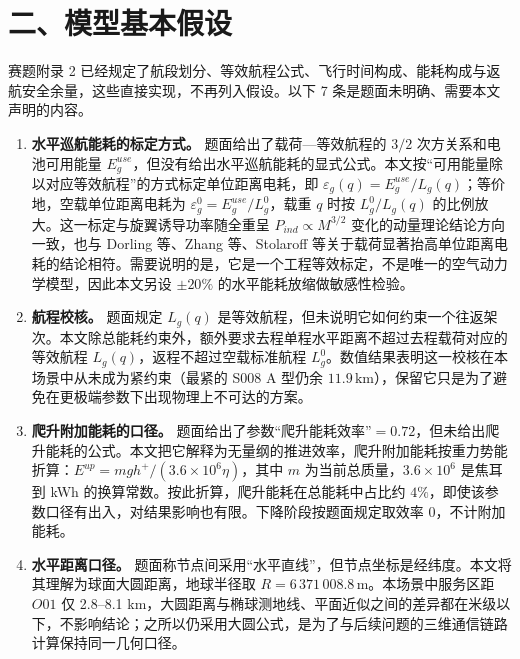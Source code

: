 \documentclass[withoutpreface,bwprint]{format}
\begin{document}
\section{二、模型基本假设}

赛题附录 2 已经规定了航段划分、等效航程公式、飞行时间构成、能耗构成与返航安全余量，这些直接实现，不再列入假设。以下 7 条是题面未明确、需要本文声明的内容。

\begin{enumerate}[label=\textbf{假设 \arabic*：}, leftmargin=*]
    \item \textbf{水平巡航能耗的标定方式。} 题面给出了载荷—等效航程的 $3/2$ 次方关系和电池可用能量 $E_g^{use}$，但没有给出水平巡航能耗的显式公式。本文按“可用能量除以对应等效航程”的方式标定单位距离电耗，即 $\varepsilon_g(q)=E_g^{use}/L_g(q)$；等价地，空载单位距离电耗为 $\varepsilon_g^0=E_g^{use}/L_g^0$，载重 $q$ 时按 $L_g^0/L_g(q)$ 的比例放大。这一标定与旋翼诱导功率随全重呈 $P_{ind}\propto M^{3/2}$ 变化的动量理论结论\cite{leishman2006}方向一致，也与 Dorling 等\cite{dorling2017}、Zhang 等\cite{zhang2021}、Stolaroff 等\cite{stolaroff2018}关于载荷显著抬高单位距离电耗的结论相符。需要说明的是，它是一个工程等效标定，不是唯一的空气动力学模型，因此本文另设 $\pm20\%$ 的水平能耗放缩做敏感性检验。

    \item \textbf{航程校核。} 题面规定 $L_g(q)$ 是等效航程，但未说明它如何约束一个往返架次。本文除总能耗约束外，额外要求去程单程水平距离不超过去程载荷对应的等效航程 $L_g(q)$，返程不超过空载标准航程 $L_g^0$。数值结果表明这一校核在本场景中从未成为紧约束（最紧的 S008 A 型仍余 $11.9\,\text{km}$），保留它只是为了避免在更极端参数下出现物理上不可达的方案。

    \item \textbf{爬升附加能耗的口径。} 题面给出了参数“爬升能耗效率”$=0.72$，但未给出爬升能耗的公式。本文把它解释为无量纲的推进效率，爬升附加能耗按重力势能折算：$E^{up}=mgh^+/(3.6\times10^6\eta)$，其中 $m$ 为当前总质量，$3.6\times10^6$ 是焦耳到 kWh 的换算常数。按此折算，爬升能耗在总能耗中占比约 $4\%$，即使该参数口径有出入，对结果影响也有限。下降阶段按题面规定取效率 0，不计附加能耗。

    \item \textbf{水平距离口径。} 题面称节点间采用“水平直线”，但节点坐标是经纬度。本文将其理解为球面大圆距离，地球半径取 $R=6\,371\,008.8\,\text{m}$\cite{sinnott1984}。本场景中服务区距 $O01$ 仅 2.8--8.1 km，大圆距离与椭球测地线\cite{vincenty1975}、平面近似之间的差异都在米级以下，不影响结论；之所以仍采用大圆公式，是为了与后续问题的三维通信链路计算保持同一几何口径。


\end{enumerate}
\end{document}
